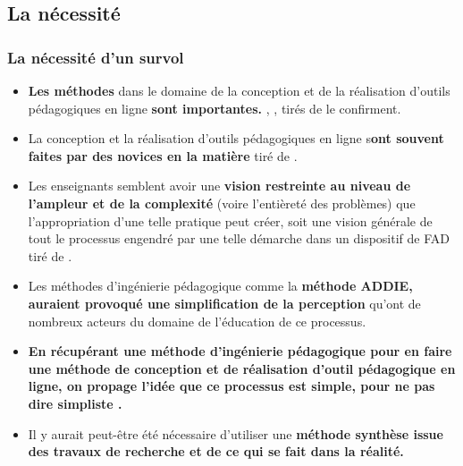 \subsection{La nécessité} 
		\begin{frame}[allowframebreaks]
			\frametitle{La nécessité d’un survol}
                        
                        \begin{itemize} 
                        \item  \textbf{Les méthodes }dans le domaine de la conception et de la réalisation d’outils pédagogiques en ligne \textbf{sont importantes.} \citet[p. 842]{bohl2002a}, \citet[p. 218]{barry2003a}, \citet[p. 1]{hadjerrouit2007a} tirés de \cite{bonneau2013a} le confirment.
                        \item La conception et la réalisation d’outils pédagogiques en ligne s\textbf{ont souvent faites par des novices en la matière} \citep[p. 351]{verstegen2008a} tiré de \citet{bonneau2013a}.
                        \item Les enseignants semblent avoir une \textbf{vision restreinte au niveau de l’ampleur et de la complexité} (voire l’entièreté des problèmes) que l’appropriation d’une telle pratique peut créer, soit une vision générale de tout le processus engendré par une telle démarche dans un dispositif de FAD \citep[p. 105]{roy2011a} tiré de \citet{bonneau2013a}.
                        \item Les méthodes d’ingénierie pédagogique comme la \textbf{méthode ADDIE, auraient provoqué une simplification de la perception} qu’ont de nombreux acteurs du domaine de l’éducation de ce processus\citep[p.28]{bonneau2013a}.
                        \item \textbf{En récupérant une méthode d’ingénierie pédagogique pour en faire une méthode de conception et de réalisation d’outil pédagogique en ligne, on propage l’idée que ce processus est simple, pour ne pas dire simpliste \citep[p.29]{bonneau2013a}.}
                        \item Il y aurait peut-être été nécessaire d'utiliser une \textbf{méthode synthèse issue des travaux de recherche et de ce qui se fait dans la réalité.}

                        \end{itemize}

             
                \end{frame}
                
